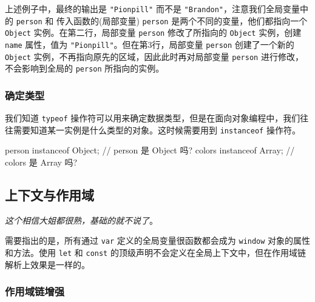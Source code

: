 上述例子中，最终的输出是 \texttt{"Pionpill"} 而不是 \texttt{"Brandon"}，注意我们全局变量中的 \texttt{person} 和 传入函数的(局部变量) \texttt{person} 是两个不同的变量，他们都指向一个 \texttt{Object} 实例。在第二行，局部变量 \texttt{person} 修改了所指向的 \texttt{Object} 实例，创建 \texttt{name} 属性，值为 \texttt{"Pionpill"}。但在第3行，局部变量 \texttt{person} 创建了一个新的 \texttt{Object} 实例，不再指向原先的区域，因此此时再对局部变量 \texttt{person} 进行修改，不会影响到全局的 \texttt{person} 所指向的实例。


\subsubsection{确定类型}

我们知道 \texttt{typeof} 操作符可以用来确定数据类型，但是在面向对象编程中，我们往往需要知道某一实例是什么类型的对象。这时候需要用到 \texttt{instanceof} 操作符。 

\begin{JavaScript}
person instanceof Object;   // person 是 Object 吗?
colors instanceof Array;    // colors 是 Array 吗?
\end{JavaScript}


\subsection{上下文与作用域}

\textit{这个相信大姐都很熟，基础的就不说了}。

需要指出的是，所有通过 \texttt{var} 定义的全局变量很函数都会成为 \texttt{window} 对象的属性和方法。使用 \texttt{let} 和 \texttt{const} 的顶级声明不会定义在全局上下文中，但在作用域链解析上效果是一样的。

\subsubsection{作用域链增强}

